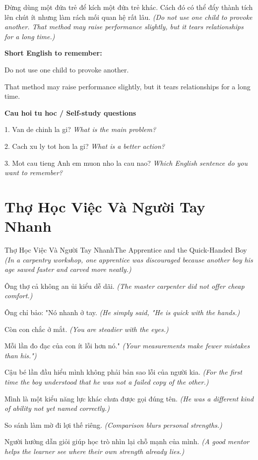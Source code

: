 \begin{baihoc}
Đừng dùng một đứa trẻ để kích một đứa trẻ khác. Cách đó có thể đẩy thành tích lên chút ít nhưng làm rách mối quan hệ rất lâu.
\textit{(Do not use one child to provoke another. That method may raise performance slightly, but it tears relationships for a long time.)}
\end{baihoc}

\begin{ghinhoanh}
\textbf{Short English to remember:}

Do not use one child to provoke another.

That method may raise performance slightly, but it tears relationships for a long time.

\end{ghinhoanh}

\begin{tuhocnhanh}
\textbf{Cau hoi tu hoc / Self-study questions}

1. Van de chinh la gi? \textit{What is the main problem?}

2. Cach xu ly tot hon la gi? \textit{What is a better action?}

3. Mot cau tieng Anh em muon nho la cau nao? \textit{Which English sentence do you want to remember?}
\end{tuhocnhanh}
\ngancach

\section{Thợ Học Việc Và Người Tay Nhanh}
\begin{truyen}{Thợ Học Việc Và Người Tay Nhanh}{The Apprentice and the Quick-Handed Boy}
\textit{(In a carpentry workshop, one apprentice was discouraged because another boy his age sawed faster and carved more neatly.)}

Ông thợ cả không an ủi kiểu dễ dãi.
\textit{(The master carpenter did not offer cheap comfort.)}

Ông chỉ bảo: "Nó nhanh ở tay.
\textit{(He simply said, "He is quick with the hands.)}

Còn con chắc ở mắt.
\textit{(You are steadier with the eyes.)}

Mỗi lần đo đạc của con ít lỗi hơn nó."
\textit{(Your measurements make fewer mistakes than his.")}

Cậu bé lần đầu hiểu mình không phải bản sao lỗi của người kia.
\textit{(For the first time the boy understood that he was not a failed copy of the other.)}

Mình là một kiểu năng lực khác chưa được gọi đúng tên.
\textit{(He was a different kind of ability not yet named correctly.)}

So sánh làm mờ đi lợi thế riêng.
\textit{(Comparison blurs personal strengths.)}

Người hướng dẫn giỏi giúp học trò nhìn lại chỗ mạnh của mình.
\textit{(A good mentor helps the learner see where their own strength already lies.)}

\end{truyen}

